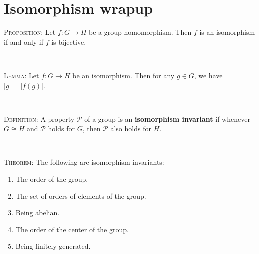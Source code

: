 \documentclass[12pt]{amsart}
\newcommand{\showsol}[1]{\def\displaysol{#1}}
\begin{document}
\showsol{0}
	
	\thispagestyle{empty}
	
	\section*{Isomorphism wrapup}
	
	

\begin{framed}
\textsc{Proposition:} Let $f: G\to H$ be a group homomorphism. Then $f$ is an isomorphism if and only if $f$ is bijective\footnotemark.

\


\textsc{Lemma:} Let $f:G\to H$ be an isomorphism. Then for any $g\in G$, we have $|g| = |f(g)|$.

\


\textsc{Definition:} A property $\mathcal{P}$ of a group is an \textbf{isomorphism invariant} if whenever $G\cong H$ and $\mathcal{P}$ holds for $G$, then $\mathcal{P}$ also holds for $H$.

\


\textsc{Theorem:} The following are isomorphism invariants:
\begin{enumerate}
\item The order of the group.
\item The set of orders of elements of the group.
\item Being abelian.
\item The order of the center of the group.
\item Being finitely generated.
\end{enumerate}

\end{framed}
\end{document}
